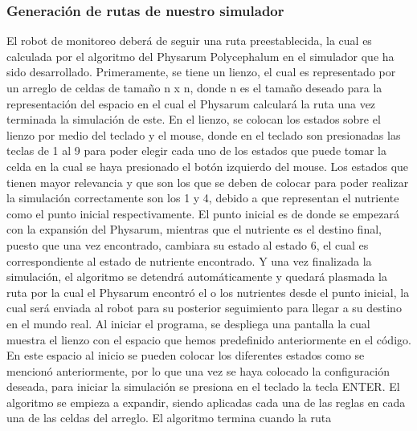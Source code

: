 \subsubsection{Generaci\'on de rutas de nuestro simulador} %
\label{ssub:subsubsection name}

    El robot de monitoreo deber\'a de seguir una ruta
        preestablecida, la cual es calculada por el algoritmo del
        Physarum Polycephalum en el simulador que ha sido
        desarrollado.
    \vskip 0.5cm
    Primeramente, se tiene un lienzo, el cual es representado por
        un arreglo de celdas de tama\~no n x n, donde n es el tama\~no
        deseado para la representaci\'on del espacio en el cual el
        Physarum calcular\'a la ruta una vez terminada la simulaci\'on
        de este.
    \vskip 0.5cm
    En el lienzo, se colocan los estados sobre el lienzo por medio
        del teclado y el mouse, donde en el teclado son presionadas
        las teclas de 1 al 9 para poder elegir cada uno de los estados
        que puede tomar la celda en la cual se haya presionado el
        bot\'on izquierdo del mouse. Los estados que tienen mayor
        relevancia y que son los que se deben de colocar para poder
        realizar la simulaci\'on correctamente son los 1 y 4, debido a
        que representan el nutriente como el punto inicial
        respectivamente. El punto inicial es de donde se empezar\'a
        con la expansi\'on del Physarum, mientras que el nutriente es
        el destino final, puesto que una vez encontrado, cambiara su
        estado al estado 6, el cual es correspondiente al estado de
        nutriente encontrado. Y una vez finalizada la simulaci\'on, el
        algoritmo se detendr\'a autom\'aticamente y quedar\'a plasmada
        la ruta por la cual el Physarum encontr\'o el o los nutrientes
        desde el punto inicial, la cual ser\'a enviada al robot para su
        posterior seguimiento para llegar a su destino en el mundo
        real.
    \vskip 0.5cm
    Al iniciar el programa, se despliega una pantalla la cual
        muestra el lienzo con el espacio que hemos predefinido
        anteriormente en el c\'odigo. En este espacio al inicio se
        pueden colocar los diferentes estados como se mencion\'o
        anteriormente, por lo que una vez se haya colocado la
        configuraci\'on deseada, para iniciar la simulaci\'on se presiona
        en el teclado la tecla ENTER. El algoritmo se empieza a
        expandir, siendo aplicadas cada una de las reglas en cada una
        de las celdas del arreglo. El algoritmo termina cuando la ruta
